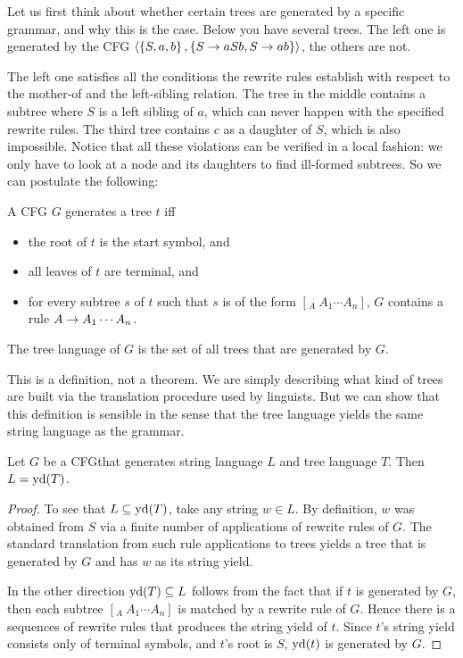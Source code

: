 Let us first think about whether certain trees are generated by a specific grammar, and why this is the case.
Below you have several trees.
The left one is generated by the CFG $\left \langle \left \{ S,a,b \right \}, \left \{ S \rightarrow aSb, S \rightarrow ab \right \} \right \rangle $, the others are not.
%
\begin{center}
    
    \hspace{2em}
    
    \hspace{2em}
    
\end{center}
%
The left one satisfies all the conditions the rewrite rules establish with respect to the mother-of and the left-sibling relation.
The tree in the middle contains a subtree where $S$ is a left sibling of $a$, which can never happen with the specified rewrite rules.
The third tree contains $c$ as a daughter of $S$, which is also impossible.
Notice that all these violations can be verified in a local fashion: we only have to look at a node and its daughters to find ill-formed subtrees.
So we can postulate the following:
%
\begin{definition}
    A CFG $G$ generates a tree $t$ iff
    \begin{itemize}
        \item the root of $t$ is the start symbol, and
        \item all leaves of $t$ are terminal, and
        \item for every subtree $s$ of $t$ such that $s$ is of the form $[_A\ A_1 \cdots A_n]$, $G$ contains a rule $A \rightarrow A_1 \cdots A_n$.
    \end{itemize}
    The tree language of $G$ is the set of all trees that are generated by $G$.
\end{definition}

This is a definition, not a theorem.
We are simply describing what kind of trees are built via the translation procedure used by linguists.
But we can show that this definition is sensible in the sense that the tree language yields the same string language as the grammar.
%
\begin{theorem}
    Let $G$ be a CFG\@ that generates string language $L$ and tree language $T$.
    Then $L = \mathrm{yd}(T)$.
\end{theorem}
%
\begin{proof}
    To see that $L \subseteq \mathrm{yd}(T)$, take any string $w \in L$.
    By definition, $w$ was obtained from $S$ via a finite number of applications of rewrite rules of $G$.
    The standard translation from such rule applications to trees yields a tree that is generated by $G$ and has $w$ as its string yield.

    In the other direction $\mathrm{yd}(T) \subseteq L$ follows from the fact that if $t$ is generated by $G$, then each subtree $[_A\ A_1 \cdots A_n]$ is matched by a rewrite rule of $G$.
    Hence there is a sequences of rewrite rules that produces the string yield of $t$. 
    Since $t$'s string yield consists only of terminal symbols, and $t$'s root is $S$, $\mathrm{yd}(t)$ is generated by $G$.
\end{proof}

